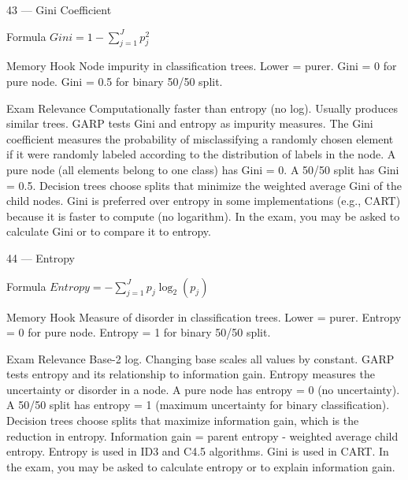 \documentclass[aspectratio=169,8pt]{beamer}
\begin{document}
	\begin{frame}{43 --- Gini Coefficient}
		\begin{block}{Formula}
			$Gini = 1 - \sum_{j=1}^{J} p_j^2$
		\end{block}
		\begin{block}{Memory Hook}
			Node impurity in classification trees. Lower = purer. Gini = 0 for pure node. Gini = 0.5 for binary 50/50 split.
		\end{block}
		\begin{block}{Exam Relevance}
			Computationally faster than entropy (no log). Usually produces similar trees. GARP tests Gini and entropy as impurity measures. The Gini coefficient measures the probability of misclassifying a randomly chosen element if it were randomly labeled according to the distribution of labels in the node. A pure node (all elements belong to one class) has Gini = 0. A 50/50 split has Gini = 0.5. Decision trees choose splits that minimize the weighted average Gini of the child nodes. Gini is preferred over entropy in some implementations (e.g., CART) because it is faster to compute (no logarithm). In the exam, you may be asked to calculate Gini or to compare it to entropy.
		\end{block}
	\end{frame}
	
	\begin{frame}{44 --- Entropy}
		\begin{block}{Formula}
			$Entropy = -\sum_{j=1}^{J} p_j \log_2(p_j)$
		\end{block}
		\begin{block}{Memory Hook}
			Measure of disorder in classification trees. Lower = purer. Entropy = 0 for pure node. Entropy = 1 for binary 50/50 split.
		\end{block}
		\begin{block}{Exam Relevance}
			Base-2 log. Changing base scales all values by constant. GARP tests entropy and its relationship to information gain. Entropy measures the uncertainty or disorder in a node. A pure node has entropy = 0 (no uncertainty). A 50/50 split has entropy = 1 (maximum uncertainty for binary classification). Decision trees choose splits that maximize information gain, which is the reduction in entropy. Information gain = parent entropy - weighted average child entropy. Entropy is used in ID3 and C4.5 algorithms. Gini is used in CART. In the exam, you may be asked to calculate entropy or to explain information gain.
		\end{block}
	\end{frame}
	
\end{document}
